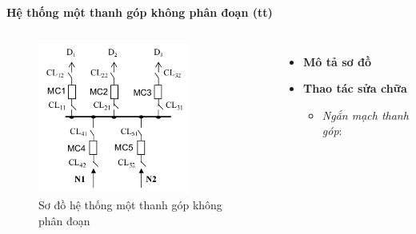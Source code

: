 \documentclass{beamer}
\begin{document}
\begin{frame}{\textbf{Hệ thống một thanh góp không phân đoạn (tt)}}
\begin{columns}
\begin{figure}[h]
\includegraphics[width=5cm, height=5cm]{mtgkpd}
\caption{Sơ đồ hệ thống một thanh góp không phân đoạn}
\end{figure}

\begin{itemize}
\item \textbf{Mô tả sơ đồ}
\item  \textbf{Thao tác sửa chữa}
\begin{itemize}
\item<1-> \emph{Ngắn mạch thanh góp}: 
\end{itemize}
\end{itemize}
\end{columns}
\end{frame}
\end{document}
